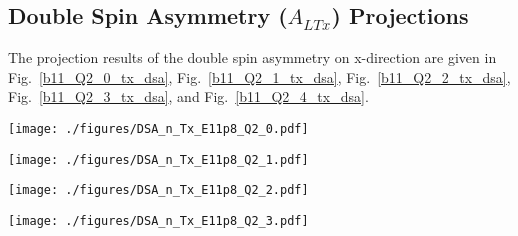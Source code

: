 \clearpage
 \subsection{Double Spin Asymmetry ($A_{LTx}$) Projections}
The projection results of the double spin asymmetry on x-direction are given in Fig.~\ref{b11_Q2_0_tx_dsa}, Fig.~\ref{b11_Q2_1_tx_dsa}, Fig.~\ref{b11_Q2_2_tx_dsa}, Fig.~\ref{b11_Q2_3_tx_dsa}, and Fig.~\ref{b11_Q2_4_tx_dsa}. 

 \begin{sidewaysfigure}
 \begin{center}
  \texttt{[image: ./figures/DSA\_n\_Tx\_E11p8\_Q2\_0.pdf]}
  \caption{\footnotesize{Transversely polarized target double-spin asymmetry ($A_{LTx}$) distributions distribution at $Q^{2}\sim 1.5~GeV^{2}$ with $E_{beam}=8.8~GeV~and~11~GeV$}}
  \label{b11_Q2_0_tx_dsa}
 \end{center}
\end{sidewaysfigure}
 \begin{sidewaysfigure}
 \begin{center}
  \texttt{[image: ./figures/DSA\_n\_Tx\_E11p8\_Q2\_1.pdf]}
  \caption{\footnotesize{Transversely polarized target double-spin asymmetry ($A_{LTx}$) distributions distribution at $Q^{2}\sim 2.5~GeV^{2}$ with $E_{beam}=8.8~GeV~and~11~GeV$}}
  \label{b11_Q2_1_tx_dsa}
 \end{center}
\end{sidewaysfigure}

 \begin{sidewaysfigure}
 \begin{center}
  \texttt{[image: ./figures/DSA\_n\_Tx\_E11p8\_Q2\_2.pdf]}
  \caption{\footnotesize{Transversely polarized target double-spin asymmetry ($A_{LTx}$) distributions distribution at $Q^{2}\sim 3.5~GeV^{2}$ with $E_{beam}=8.8~GeV~and~11~GeV$}}
  \label{b11_Q2_2_tx_dsa}
 \end{center}
\end{sidewaysfigure}

 \begin{sidewaysfigure}
  \begin{center}
  \texttt{[image: ./figures/DSA\_n\_Tx\_E11p8\_Q2\_3.pdf]}
  \caption{\footnotesize{Transversely polarized target double-spin asymmetry ($A_{LTx}$) distributions distribution at $Q^{2}\sim 4.5~GeV^{2}$ with $E_{beam}=8.8~GeV~and~11~GeV$}}
  \label{b11_Q2_3_tx_dsa}
   \end{center}
\end{sidewaysfigure}

